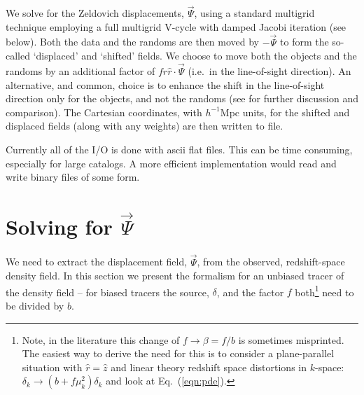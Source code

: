 \documentclass[a4paper,11pt]{article}
\begin{document}
We solve for the Zeldovich \cite{Zel70} displacements, $\vec{\Psi}$, using
a standard multigrid technique employing a full multigrid V-cycle with
damped Jacobi iteration (see below).
Both the data and the randoms are then moved by $-\vec{\Psi}$ to form the
so-called `displaced' and `shifted' fields.
We choose to move both the objects and the randoms by an additional factor
of $f\hat{r}\hat{r}\cdot\vec{\Psi}$ (i.e.~in the line-of-sight direction).
An alternative, and common, choice is to enhance the shift in the line-of-sight
direction only for the objects, and not the randoms
(see \cite{ZelRecon} for further discussion and comparison).
The Cartesian coordinates, with $h^{-1}$Mpc units, for the shifted and
displaced fields (along with any weights) are then written to file.

Currently all of the I/O is done with ascii flat files.  This can be time
consuming, especially for large catalogs.  A more efficient implementation
would read and write binary files of some form.

\section{Solving for $\vec{\Psi}$}
\label{sec:equations}

We need to extract the displacement field, $\vec{\Psi}$, from the observed,
redshift-space density field.  In this section we present the formalism for
an unbiased tracer of the density field -- for biased tracers the source,
$\delta$, and the factor $f$ both\footnote{Note, in the literature this change
of $f\to\beta=f/b$ is sometimes misprinted.  The easiest way to derive the need
for this is to consider a plane-parallel situation with $\hat{r}=\hat{z}$ and
linear theory redshift space distortions in $k$-space:
$\delta_k\to (b+f\mu_k^2)\delta_k$ and look at Eq.~(\ref{eqn:pde}).}
need to be divided by $b$.
\end{document}
